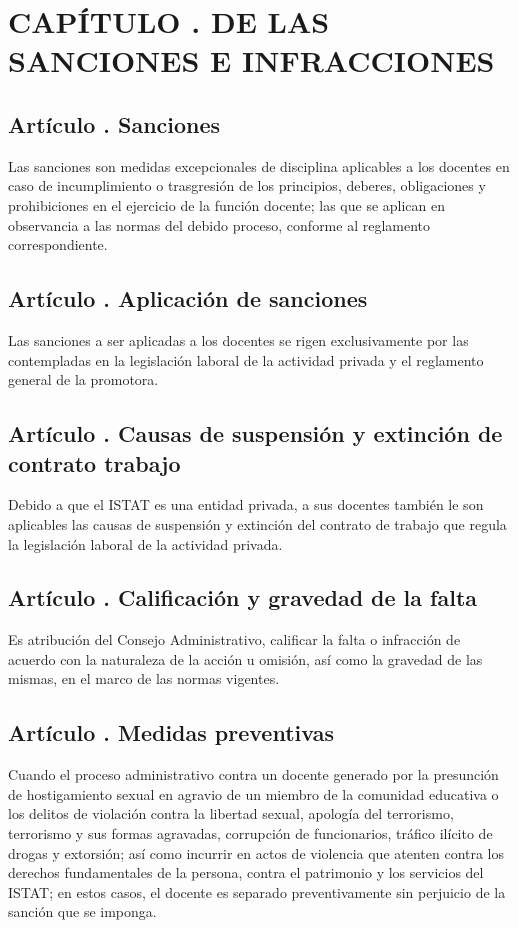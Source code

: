 \section{CAPÍTULO . DE LAS SANCIONES E INFRACCIONES}
\addtocounter{re}{1}


\subsection{Artículo . Sanciones}
\addtocounter{ns}{1}
Las sanciones son medidas excepcionales de disciplina aplicables a los docentes en caso de incumplimiento o trasgresión de los principios, deberes, obligaciones y prohibiciones en el ejercicio de la función docente; las que se aplican en observancia a las normas del debido proceso, conforme al reglamento correspondiente. 
\subsection{Artículo . Aplicación de sanciones}
\addtocounter{ns}{1}
Las sanciones a ser aplicadas a los docentes se rigen exclusivamente por las contempladas en la legislación laboral de la actividad privada y el reglamento general de la promotora.
\subsection{Artículo . Causas de suspensión y extinción de contrato trabajo}
\addtocounter{ns}{1}
Debido a que el ISTAT es una entidad privada, a sus docentes también le son aplicables las causas de suspensión y extinción del contrato de trabajo que regula la legislación laboral de la actividad privada. 
\subsection{Artículo . Calificación y gravedad de la falta}
\addtocounter{ns}{1}
Es atribución del Consejo Administrativo, calificar la falta o infracción de acuerdo con la naturaleza de la acción u omisión, así como la gravedad de las mismas, en el marco de las normas vigentes. 
\subsection{Artículo . Medidas preventivas}
\addtocounter{ns}{1}
Cuando el proceso administrativo contra un docente generado por la presunción de hostigamiento sexual en agravio de un miembro de la comunidad educativa o los delitos de violación contra la libertad sexual, apología del terrorismo, terrorismo y sus formas agravadas, corrupción de funcionarios, tráfico ilícito de drogas y extorsión; así como incurrir en actos de violencia que atenten contra los derechos fundamentales de la persona, contra el patrimonio y los servicios del ISTAT; en estos casos, el docente es separado preventivamente sin perjuicio de la sanción que se imponga.
